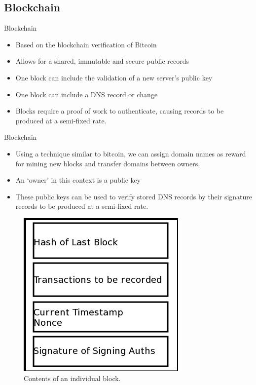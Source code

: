 \documentclass[11pt]{beamer}
\begin{document}
\subsection{Blockchain}
\begin{frame}{Blockchain}
	\begin{itemize}
		\item Based on the blockchain verification of Bitcoin
		\item Allows for a shared, immutable and secure public records
		\item One block can include the validation of a new server's public key
		\item  One block can include a DNS record or change
		\item  Blocks require a proof of work to authenticate, causing records to be produced at a semi-fixed rate.
	\end{itemize}
\end{frame}

\begin{frame}{Blockchain}
	\begin{itemize}
		\item Using a technique similar to bitcoin, we can assign domain names as reward for mining new blocks and transfer domains between owners.
		
		\item An `owner' in this context is a public key
		
		\item These public keys can be used to verify stored DNS records by their signature
		records to be produced at a semi-fixed rate.
	\end{itemize}
\end{frame}




\begin{frame}
	\begin{figure}
	\centering
	\includegraphics[width=0.4\linewidth]{namecoin_block}
	\caption{Contents of an individual block.}
	\label{fig:blockchain}
	\end{figure}

\end{frame}
\end{document}
